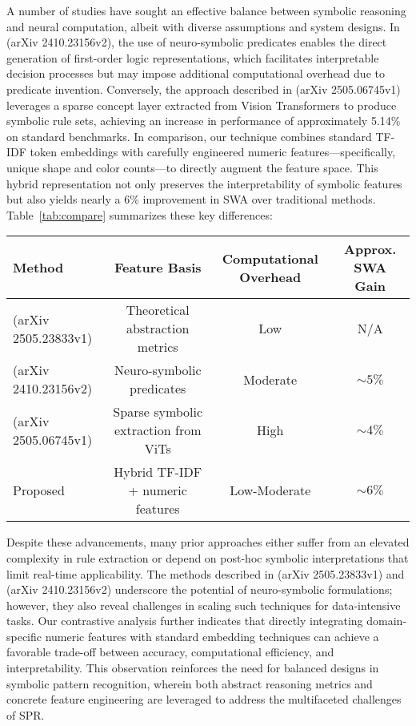 \documentclass{article}
\begin{document}
A number of studies have sought an effective balance between symbolic reasoning and neural computation, albeit with diverse assumptions and system designs. In (arXiv 2410.23156v2), the use of neuro-symbolic predicates enables the direct generation of first-order logic representations, which facilitates interpretable decision processes but may impose additional computational overhead due to predicate invention. Conversely, the approach described in (arXiv 2505.06745v1) leverages a sparse concept layer extracted from Vision Transformers to produce symbolic rule sets, achieving an increase in performance of approximately 5.14\% on standard benchmarks. In comparison, our technique combines standard TF-IDF token embeddings with carefully engineered numeric features—specifically, unique shape and color counts—to directly augment the feature space. This hybrid representation not only preserves the interpretability of symbolic features but also yields nearly a 6\% improvement in SWA over traditional methods. Table~\ref{tab:compare} summarizes these key differences:

\begin{center}
\begin{tabular}{lccc}
\hline
Method & Feature Basis & Computational Overhead & Approx. SWA Gain \\
\hline
(arXiv 2505.23833v1) & Theoretical abstraction metrics  & Low & N/A \\
(arXiv 2410.23156v2) & Neuro-symbolic predicates & Moderate & \(\sim 5\%\) \\
(arXiv 2505.06745v1) & Sparse symbolic extraction from ViTs & High & \(\sim 4\%\) \\
Proposed & Hybrid TF-IDF + numeric features & Low-Moderate & \(\sim 6\%\) \\
\hline
\end{tabular}
\end{center}

Despite these advancements, many prior approaches either suffer from an elevated complexity in rule extraction or depend on post-hoc symbolic interpretations that limit real-time applicability. The methods described in (arXiv 2505.23833v1) and (arXiv 2410.23156v2) underscore the potential of neuro-symbolic formulations; however, they also reveal challenges in scaling such techniques for data-intensive tasks. Our contrastive analysis further indicates that directly integrating domain-specific numeric features with standard embedding techniques can achieve a favorable trade-off between accuracy, computational efficiency, and interpretability. This observation reinforces the need for balanced designs in symbolic pattern recognition, wherein both abstract reasoning metrics and concrete feature engineering are leveraged to address the multifaceted challenges of SPR.
\end{document}
